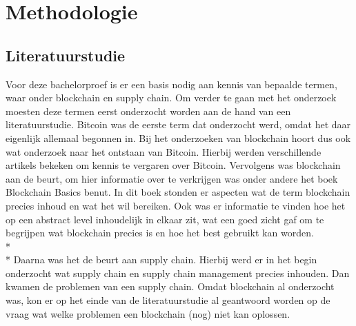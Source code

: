 
\chapter{Methodologie}
\label{ch:methodologie}

\section{Literatuurstudie}
Voor deze bachelorproef is er een basis nodig aan kennis van bepaalde termen, waar onder blockchain en supply chain. Om verder te gaan met het onderzoek moesten deze termen eerst onderzocht worden aan de hand van een literatuurstudie. Bitcoin was de eerste term dat onderzocht werd, omdat het daar eigenlijk allemaal begonnen in. Bij het onderzoeken van blockchain hoort dus ook wat onderzoek naar het ontstaan van Bitcoin. Hierbij werden verschillende artikels bekeken om kennis te vergaren over Bitcoin. Vervolgens was blockchain aan de beurt, om hier informatie over te verkrijgen was onder andere het boek Blockchain Basics benut. In dit boek stonden er aspecten wat de term blockchain precies inhoud en wat het wil bereiken. Ook was er informatie te vinden hoe het op een abstract level inhoudelijk in elkaar zit, wat een goed zicht gaf om te begrijpen wat blockchain precies is en hoe het best gebruikt kan worden.\\*\\*
Daarna was het de beurt aan supply chain. Hierbij werd er in het begin onderzocht wat supply chain en supply chain management precies inhouden. Dan kwamen de problemen van een supply chain. Omdat blockchain al onderzocht was, kon er op het einde van de literatuurstudie al geantwoord worden op de vraag wat welke problemen een blockchain (nog) niet kan oplossen.

